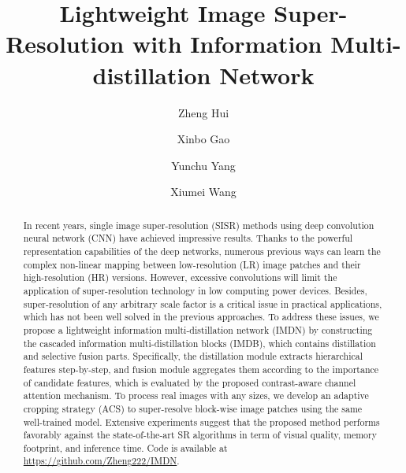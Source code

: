 \documentclass[sigconf]{acmart}
\begin{document}
\fancyhead{}



\title[Lightweight Image SR with IMDN]{Lightweight Image Super-Resolution with Information Multi-distillation Network}


\author{Zheng Hui}

\author{Xinbo Gao}

\author{Yunchu Yang}

\author{Xiumei Wang}



\renewcommand{\shortauthors}{Hui and Gao, et al.}

\begin{abstract}
In recent years, single image super-resolution (SISR) methods using deep convolution neural network (CNN) have achieved impressive results. Thanks to the powerful representation capabilities of the deep networks, numerous previous ways can learn the complex non-linear mapping between low-resolution (LR) image patches and their high-resolution (HR) versions. However, excessive convolutions will limit the application of super-resolution technology in low computing power devices. Besides, super-resolution of any arbitrary scale factor is a critical issue in practical applications, which has not been well solved in the previous approaches. To address these issues, we propose a lightweight information multi-distillation network (IMDN) by constructing the cascaded information multi-distillation blocks (IMDB), which contains distillation and selective fusion parts. Specifically, the distillation module extracts hierarchical features step-by-step, and fusion module aggregates them according to the importance of candidate features, which is evaluated by the proposed contrast-aware channel attention mechanism. To process real images with any sizes, we develop an adaptive cropping strategy (ACS) to super-resolve block-wise image patches using the same well-trained model. Extensive experiments suggest that the proposed method performs favorably against the state-of-the-art SR algorithms in term of visual quality, memory footprint, and inference time. Code is available at \url{https://github.com/Zheng222/IMDN}.
\end{abstract}
\end{document}
